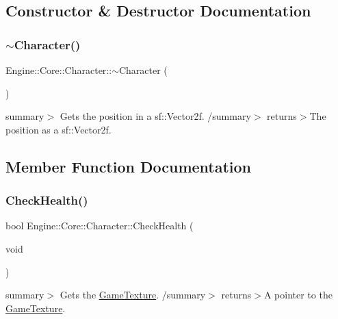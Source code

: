 \subsection{Constructor \& Destructor Documentation}
\mbox{\label{class_engine_1_1_core_1_1_character_a0377de26714b79374d0591ca44c77fd1}} 
\subsubsection{\texorpdfstring{$\sim$\+Character()}{~Character()}}
{\footnotesize\ttfamily Engine\+::\+Core\+::\+Character\+::$\sim$\+Character (\begin{DoxyParamCaption}{ }\end{DoxyParamCaption})}

summary$>$ Gets the position in a sf\+::\+Vector2f. /summary$>$ returns$>$The position as a sf\+::\+Vector2f.

\subsection{Member Function Documentation}
\mbox{\label{class_engine_1_1_core_1_1_character_ad32924505f5bc7761590ecbfd06e6f09}} 
\subsubsection{\texorpdfstring{Check\+Health()}{CheckHealth()}}
{\footnotesize\ttfamily bool Engine\+::\+Core\+::\+Character\+::\+Check\+Health (\begin{DoxyParamCaption}\item[{void}]{ }\end{DoxyParamCaption})}

summary$>$ Gets the \hyperlink{class_engine_1_1_core_1_1_game_texture}{Game\+Texture}. /summary$>$ returns$>$A pointer to the \hyperlink{class_engine_1_1_core_1_1_game_texture}{Game\+Texture}.\mbox{\label{class_engine_1_1_core_1_1_character_ae25a76e7497eeb6dbd1ad3b72c1ff721}} 

